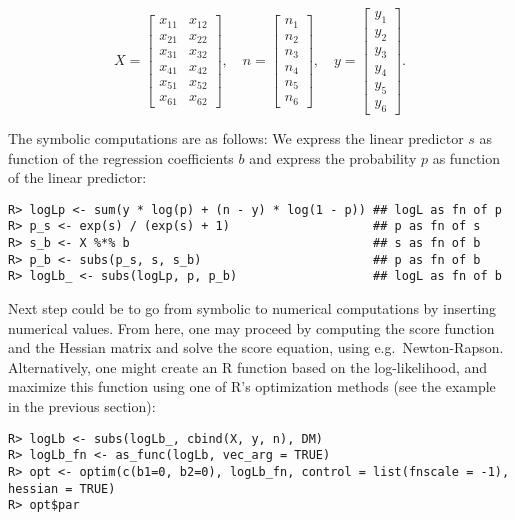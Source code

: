 \[
 X=\left[\begin{matrix}x_{11} & x_{12}\\x_{21} & x_{22}\\x_{31} & x_{32}\\x_{41} & x_{42}\\x_{51} & x_{52}\\x_{61} & x_{62}\end{matrix}\right], \quad
 n=\left[\begin{matrix}n_{1}\\n_{2}\\n_{3}\\n_{4}\\n_{5}\\n_{6}\end{matrix}\right], \quad
 y=\left[\begin{matrix}y_{1}\\y_{2}\\y_{3}\\y_{4}\\y_{5}\\y_{6}\end{matrix}\right] .
\]

The symbolic computations are as follows: We express the linear predictor \(s\) as function of the regression coefficients \(b\) and express the probability \(p\) as function of the linear predictor:

\begin{verbatim}
R> logLp <- sum(y * log(p) + (n - y) * log(1 - p)) ## logL as fn of p
R> p_s <- exp(s) / (exp(s) + 1)                    ## p as fn of s
R> s_b <- X %*% b                                  ## s as fn of b
R> p_b <- subs(p_s, s, s_b)                        ## p as fn of b
R> logLb_ <- subs(logLp, p, p_b)                   ## logL as fn of b
\end{verbatim}

Next step could be to go from symbolic to numerical computations by
inserting numerical values. From here, one may proceed by computing
the score function and the Hessian matrix and solve the score
equation, using e.g.~Newton-Rapson. Alternatively, one might create an
R function based on the log-likelihood, and maximize this function
using one of R's optimization methods (see the example in the
previous section):

\begin{verbatim}
R> logLb <- subs(logLb_, cbind(X, y, n), DM)
R> logLb_fn <- as_func(logLb, vec_arg = TRUE)
R> opt <- optim(c(b1=0, b2=0), logLb_fn, control = list(fnscale = -1), hessian = TRUE)
R> opt$par
\end{verbatim}

